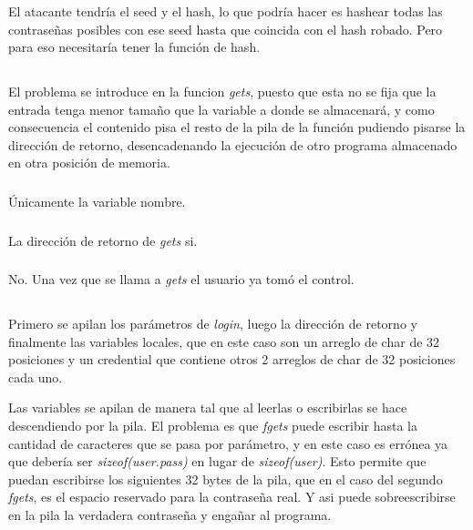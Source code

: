 \subsubsection{}
El atacante tendría el seed y el hash, lo que podría hacer es hashear todas
las contraseñas posibles con ese seed hasta que coincida con el hash robado.
Pero para eso necesitaría tener la función de hash.

\subsection{}

\subsubsection{}
El problema se introduce en la funcion \textit{gets}, puesto que esta no se
fija que la entrada tenga menor tamaño que la variable a donde se almacenará,
y como consecuencia el contenido pisa el resto de la pila de la función
pudiendo pisarse la dirección de retorno, desencadenando la ejecución de otro
programa almacenado en otra posición de memoria.

\subsubsection{}
Únicamente la variable nombre.

\subsubsection{}
La dirección de retorno de \textit{gets} si.

\subsubsection{}
No. Una vez que se llama a \textit{gets} el usuario ya tomó el control.

\subsection{}
Primero se apilan los parámetros de \textit{login}, luego la dirección de
retorno y finalmente las variables locales, que en este caso son un arreglo de
char de 32 posiciones y un credential que contiene otros 2 arreglos de char de
32 posiciones cada uno.

Las variables se apilan de manera tal que al leerlas o escribirlas se hace
descendiendo por la pila. El problema es que \textit{fgets} puede escribir
hasta la cantidad de caracteres que se pasa por parámetro, y en este caso es
errónea ya que debería ser \textit{sizeof(user.pass)} en lugar de
\textit{sizeof(user)}. Esto permite que puedan escribirse los siguientes 32
bytes de la pila, que en el caso del segundo \textit{fgets}, es el espacio
reservado para la contraseña real. Y asi puede sobreescribirse en la pila la
verdadera contraseña y engañar al programa.

